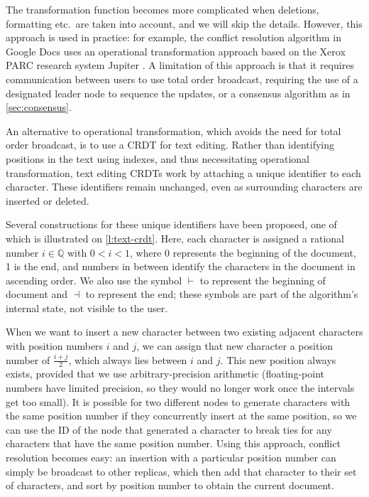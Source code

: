 The transformation function becomes more complicated when deletions, formatting etc.\ are taken into account, and we will skip the details.
However, this approach is used in practice: for example, the conflict resolution algorithm in Google Docs uses an operational transformation approach based on the Xerox PARC research system Jupiter \citep{Nichols:1995}.
A limitation of this approach is that it requires communication between users to use total order broadcast, requiring the use of a designated leader node to sequence the updates, or a consensus algorithm as in \autoref{sec:consensus}.

An alternative to operational transformation, which avoids the need for total order broadcast, is to use a CRDT for text editing.
Rather than identifying positions in the text using indexes, and thus necessitating operational transformation, text editing CRDTs work by attaching a unique identifier to each character.
These identifiers remain unchanged, even as surrounding characters are inserted or deleted.

Several constructions for these unique identifiers have been proposed, one of which is illustrated on \autoref{l:text-crdt}.
Here, each character is assigned a rational number $i \in \mathbb{Q}$ with $0 < i < 1$, where 0 represents the beginning of the document, 1 is the end, and numbers in between identify the characters in the document in ascending order.
We also use the symbol $\vdash$ to represent the beginning of document and $\dashv$ to represent the end; these symbols are part of the algorithm's internal state, not visible to the user.

When we want to insert a new character between two existing adjacent characters with position numbers $i$ and $j$, we can assign that new character a position number of $\frac{i+j}{2}$, which always lies between $i$ and $j$.
This new position always exists, provided that we use arbitrary-precision arithmetic (floating-point numbers have limited precision, so they would no longer work once the intervals get too small).
It is possible for two different nodes to generate characters with the same position number if they concurrently insert at the same position, so we can use the ID of the node that generated a character to break ties for any characters that have the same position number.
Using this approach, conflict resolution becomes easy: an insertion with a particular position number can simply be broadcast to other replicas, which then add that character to their set of characters, and sort by position number to obtain the current document.

